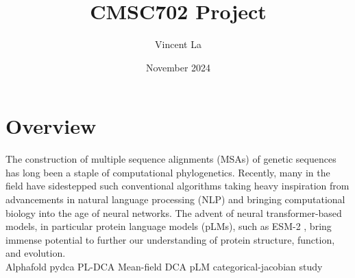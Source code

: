 \documentclass{article}
\title{CMSC702 Project}
\author{Vincent La}
\date{November 2024}
\begin{document}
\maketitle


\section{Overview}
The construction of multiple sequence alignments (MSAs) of genetic sequences has long been a staple of computational phylogenetics. Recently, many in the field have sidestepped such conventional algorithms taking heavy inspiration from advancements in natural language processing (NLP) and bringing computational biology into the age of neural networks. The advent of neural transformer-based models, in particular protein language models (pLMs), such as ESM-2 \cite{ESM-FOLD}, bring immense potential to further our understanding of protein structure, function, and evolution. \\

Alphafold \cite{AlphaFold}
pydca \cite{pydca}
PL-DCA \cite{Ekeberg}
Mean-field DCA \cite{Morcos}
pLM categorical-jacobian study \cite{Zhang}




\end{document}
